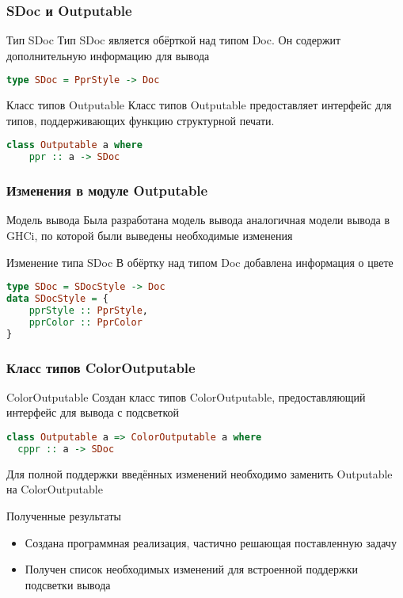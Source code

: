 \documentclass[utf8,russian]{beamer}
\begin{document}
\begin{frame}[fragile]
\frametitle{SDoc и Outputable}

\begin{block}{Тип SDoc}
Тип SDoc является обёрткой над типом Doc. Он содержит дополнительную информацию для вывода
\begin{lstlisting}[language=Haskell]
type SDoc = PprStyle -> Doc
\end{lstlisting}
\end{block}

\begin{block}{Класс типов Outputable}
Класс типов Outputable предоставляет интерфейс для типов, поддерживающих функцию структурной печати.
\begin{lstlisting}[language=Haskell]
class Outputable a where
	ppr :: a -> SDoc
\end{lstlisting}
\end{block}

\end{frame}

\begin{frame}[fragile]
\frametitle{Изменения в модуле Outputable}

\begin{block}{Модель вывода}
Была разработана модель вывода аналогичная модели вывода в GHCi, по которой были выведены необходимые изменения
\end{block}

\begin{block}{Изменение типа SDoc}
В обёртку над типом Doc добавлена информация о цвете
\begin{lstlisting}[language=Haskell]
type SDoc = SDocStyle -> Doc
data SDocStyle = {
    pprStyle :: PprStyle,
    pprColor :: PprColor
}
\end{lstlisting}
\end{block}
\end{frame}

\begin{frame}[fragile]
\frametitle{Класс типов ColorOutputable}

\begin{block}{ColorOutputable}
Создан класс типов ColorOutputable, предоставляющий интерфейс для вывода с подсветкой
\begin{lstlisting}[language=Haskell]
class Outputable a => ColorOutputable a where
  cppr :: a -> SDoc
\end{lstlisting}
\end{block}

\begin{block}{}
Для полной поддержки введённых изменений необходимо заменить Outputable на ColorOutputable
\end{block}

\end{frame}

\begin{frame}{Полученные результаты}
\begin{itemize}
  \item Создана программная реализация, частично решающая поставленную задачу
  \item Получен список необходимых изменений для встроенной поддержки подсветки вывода
\end{itemize}
\end{frame}
\end{document}
